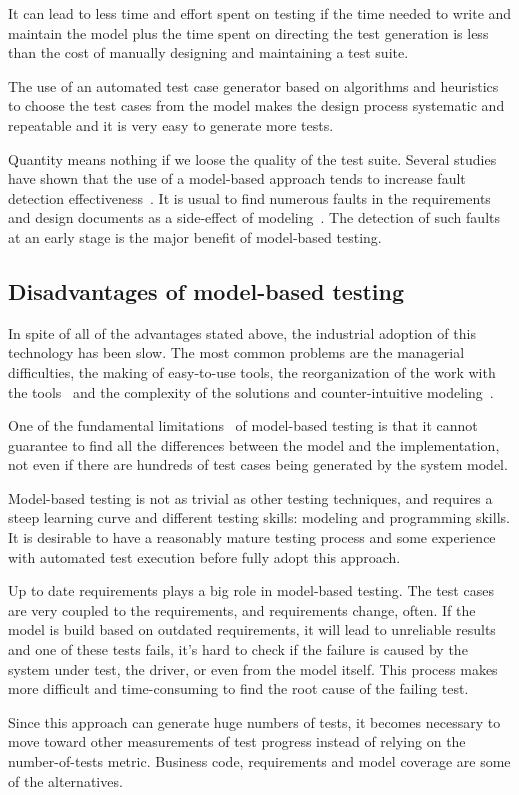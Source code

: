 It can lead to less time and effort spent on testing if the time needed to write and maintain the model plus the time spent on directing the test generation is less than the cost of manually designing and maintaining a test suite. 

The use of an automated test case generator based on algorithms and heuristics to choose the test cases from the model makes the design process systematic and repeatable and it is very easy to generate more tests.

Quantity means nothing if we loose the quality of the test
suite. Several studies have shown that the use of a
model-based approach tends to increase fault detection effectiveness~\cite{Dalal1999,Farchi2002}. It is usual to find numerous faults in the requirements and design documents as a side-effect of modeling~\cite{1200168}. The detection of such faults at an early stage is the major benefit of model-based testing.

\subsection{Disadvantages of model-based testing}

In spite of all of the advantages stated above, the industrial adoption of this technology has been slow. The most common problems are the managerial difficulties, the making of easy-to-use tools, the reorganization of the work with the tools~\cite{Robinson2013} and the complexity of the solutions and counter-intuitive modeling~\cite{Jääskeläinen2008}.

One of the fundamental limitations~\cite{1200168} of model-based testing is that it cannot guarantee to find all the differences between the model and the implementation, not even if there are hundreds of test cases being generated by the system model.

Model-based testing is not as trivial as other testing techniques, and requires a steep learning curve and different testing skills: modeling and programming skills. It is desirable to have a reasonably mature testing process and some experience with automated test execution before fully adopt this approach.

Up to date requirements plays a big role in model-based testing. The test cases are very coupled to the requirements, and requirements change, often. If the model is build based on outdated requirements, it will lead to unreliable results and one of these tests fails, it's hard to check if the failure is caused by the system under test, the driver, or even from the model itself. This process makes more difficult and time-consuming to find the root cause of the failing test.

Since this approach can generate huge numbers of tests, it becomes necessary to move toward other measurements of test progress instead of relying on the number-of-tests metric. Business code, requirements and model coverage are some of the alternatives.

